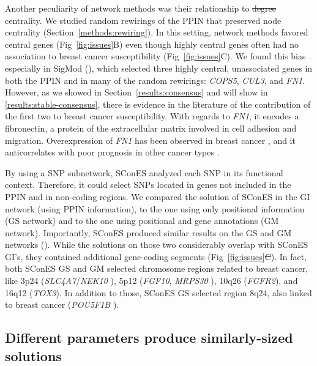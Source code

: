 \documentclass[10pt,letterpaper]{article}
\providecommand{\DIFaddtex}[1]{{\protect\color{blue}\uwave{#1}}} %
\providecommand{\DIFdeltex}[1]{{\protect\color{red}\sout{#1}}}                      %
\providecommand{\DIFaddbegin}{} %
\providecommand{\DIFaddend}{} %
\providecommand{\DIFdelbegin}{} %
\providecommand{\DIFdelend}{} %
\providecommand{\DIFadd}[1]{\texorpdfstring{\DIFaddtex{#1}}{#1}} %
\providecommand{\DIFdel}[1]{\texorpdfstring{\DIFdeltex{#1}}{}} %
\newcommand{\DIFscaledelfig}{0.5}
\newlength{\DIFdelgraphicswidth} %
\newlength{\DIFdelgraphicsheight} %
\newcommand{\DIFaddincludegraphics}[2][]{{\color{blue}\fbox{\DIFOincludegraphics[#1]{#2}}}} %
\newcommand{\DIFdelincludegraphics}[2][]{%
\sbox{\DIFdelgraphicsbox}{\DIFOincludegraphics[#1]{#2}}%
\settoboxwidth{\DIFdelgraphicswidth}{\DIFdelgraphicsbox} %
\settoboxtotalheight{\DIFdelgraphicsheight}{\DIFdelgraphicsbox} %
\scalebox{\DIFscaledelfig}{%
\parbox[b]{\DIFdelgraphicswidth}{\usebox{\DIFdelgraphicsbox}\\[-\baselineskip] \rule{\DIFdelgraphicswidth}{0em}}\llap{\resizebox{\DIFdelgraphicswidth}{\DIFdelgraphicsheight}{%
\setlength{\unitlength}{\DIFdelgraphicswidth}%
\begin{picture}(1,1)%
\thicklines\linethickness{2pt} %
{\color[rgb]{1,0,0}\put(0,0){\framebox(1,1){}}}%
{\color[rgb]{1,0,0}\put(0,0){\line( 1,1){1}}}%
{\color[rgb]{1,0,0}\put(0,1){\line(1,-1){1}}}%
\end{picture}%
}\hspace*{3pt}}} %
} %
\DeclareRobustCommand{\DIFaddbegin}{\DIFOaddbegin \let\includegraphics\DIFaddincludegraphics} %
\DeclareRobustCommand{\DIFaddend}{\DIFOaddend \let\includegraphics\DIFOincludegraphics} %
\DeclareRobustCommand{\DIFdelbegin}{\DIFOdelbegin \let\includegraphics\DIFdelincludegraphics} %
\DeclareRobustCommand{\DIFdelend}{\DIFOaddend \let\includegraphics\DIFOincludegraphics} %
\begin{document}
Another peculiarity of network methods was their relationship to \DIFdelbegin \DIFdel{degree }\DIFdelend \DIFaddbegin \DIFadd{betweenness }\DIFaddend centrality. We studied random rewirings of the PPIN that preserved node centrality (Section~\ref{methods:rewiring}). In this setting, network methods favored central genes (Fig~\ref{fig:issues}B) even though highly central genes often had no association to breast cancer susceptibility (Fig~\ref{fig:issues}C). We found this bias especially in SigMod (), which selected three highly central, unassociated genes in both the PPIN and in many of the random rewirings: \emph{COPS5}, \emph{CUL3}, and \emph{FN1}. However, as we showed in Section~\ref{results:consensus} and will show in \ref{results:stable-consensus}, there is evidence in the literature of the contribution of the first two to breast cancer susceptibility. With regards to \emph{FN1}, it encodes a fibronectin, a protein of the extracellular matrix involved in cell adhesion and migration. Overexpression of \emph{FN1} has been observed in breast cancer \cite{Ioachim2002}, and it anticorrelates with poor prognosis in other cancer types \cite{Yi2016,Sponziello2016}.

By using a SNP subnetwork, SConES analyzed each SNP in its functional context. Therefore, it could select SNPs located in genes not included in the PPIN and in non-coding regions. We compared the solution of SConES in the GI network (using PPIN information), to the one using only positional information (GS network) and to the one using positional and gene annotations (GM network). Importantly, SConES produced similar results on the GS and GM networks (). While the solutions on those two considerably overlap with SConES GI's, they contained additional gene-coding segments (Fig~\ref{fig:issues}\DIFdelbegin \DIFdel{C}\DIFdelend \DIFaddbegin \DIFadd{D}\DIFaddend ). In fact, both SConES GS and GM selected chromosome regions related to breast cancer, like 3p24 (\emph{SLC4A7}/\emph{NEK10} \cite{ahmed_newly_2009}), 5p12 (\emph{FGF10}, \emph{MRPS30} \cite{quigley_5p12_2014}), 10q26 (\emph{FGFR2}), and 16q12 (\emph{TOX3}). In addition to those, SConES GS selected region 8q24, also linked to breast cancer (\emph{POU5F1B} \cite{breyer_expressed_2014}). 

\subsection{Different parameters produce similarly-sized solutions}
\label{results:parameters}
\end{document}
